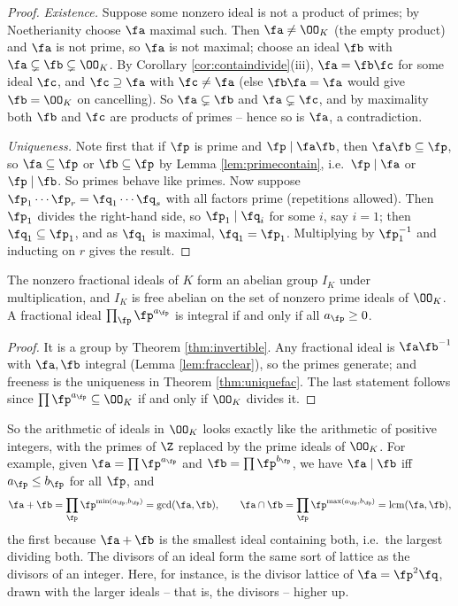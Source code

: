\begin{proof}
	\emph{Existence.} Suppose some nonzero ideal is not a product of primes; by Noetherianity choose $\fa$ maximal such. Then $\fa \neq \OO_K$ (the empty product) and $\fa$ is not prime, so $\fa$ is not maximal; choose an ideal $\fb$ with $\fa \subsetneq \fb \subsetneq \OO_K$. By Corollary \ref{cor:containdivide}(iii), $\fa = \fb\fc$ for some ideal $\fc$, and $\fc \supseteq \fa$ with $\fc \neq \fa$ (else $\fb\fa = \fa$ would give $\fb = \OO_K$ on cancelling). So $\fa \subsetneq \fb$ and $\fa \subsetneq \fc$, and by maximality both $\fb$ and $\fc$ are products of primes -- hence so is $\fa$, a contradiction.

	\emph{Uniqueness.} Note first that if $\fp$ is prime and $\fp \mid \fa\fb$, then $\fa\fb \subseteq \fp$, so $\fa \subseteq \fp$ or $\fb \subseteq \fp$ by Lemma \ref{lem:primecontain}, i.e.\ $\fp\mid\fa$ or $\fp\mid\fb$. So primes behave like primes. Now suppose $\fp_1\cdots\fp_r = \fq_1\cdots\fq_s$ with all factors prime (repetitions allowed). Then $\fp_1$ divides the right-hand side, so $\fp_1 \mid \fq_i$ for some $i$, say $i=1$; then $\fq_1 \subseteq \fp_1$, and as $\fq_1$ is maximal, $\fq_1 = \fp_1$. Multiplying by $\fp_1^{-1}$ and inducting on $r$ gives the result.
\end{proof}

\begin{corollary}\label{cor:IKfree}
	The nonzero fractional ideals of $K$ form an abelian group $I_K$ under multiplication, and $I_K$ is free abelian on the set of nonzero prime ideals of $\OO_K$. A fractional ideal $\prod_\fp \fp^{a_\fp}$ is integral if and only if all $a_\fp \geq 0$.
\end{corollary}

\begin{proof}
	It is a group by Theorem \ref{thm:invertible}. Any fractional ideal is $\fa\fb^{-1}$ with $\fa, \fb$ integral (Lemma \ref{lem:fracclear}), so the primes generate; and freeness is the uniqueness in Theorem \ref{thm:uniquefac}. The last statement follows since $\prod\fp^{a_\fp} \subseteq \OO_K$ if and only if $\OO_K$ divides it.
\end{proof}

So the arithmetic of ideals in $\OO_K$ looks exactly like the arithmetic of positive integers, with the primes of $\Z$ replaced by the prime ideals of $\OO_K$. For example, given $\fa = \prod\fp^{a_\fp}$ and $\fb = \prod\fp^{b_\fp}$, we have $\fa \mid \fb$ iff $a_\fp \leq b_\fp$ for all $\fp$, and
$$\fa + \fb = \prod_\fp \fp^{\min(a_\fp,b_\fp)} = \gcd(\fa,\fb), \qquad \fa \cap \fb = \prod_\fp \fp^{\max(a_\fp,b_\fp)} = \operatorname{lcm}(\fa,\fb),$$
the first because $\fa+\fb$ is the smallest ideal containing both, i.e.\ the largest dividing both. The divisors of an ideal form the same sort of lattice as the divisors of an integer. Here, for instance, is the divisor lattice of $\fa = \fp^2\fq$, drawn with the larger ideals -- that is, the divisors -- higher up.

